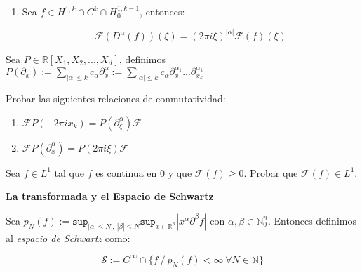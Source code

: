 \documentclass[11pt]{article}
\newcommand{\R}{{\mathbb{R}}}
\newcommand{\N}{{\mathbb{N}}}
\newenvironment{definition}[1][Definici\'on]{\begin{trivlist}
\item[\hskip \labelsep {\bfseries #1}]}{\end{trivlist}}
\newcommand{\F}{\mathcal{F}}
\newcommand{\Sw}{\mathcal{S}}
\begin{document}
\begin{enumerate}
\begin{enumerate}
\item Sea $f \in H^{1,k}\cap C^k \cap H_0^{1,k-1}$, entonces:

$$\F(D^{\alpha}(f))(\xi) = (2 \pi i \xi)^{|\alpha|} \F(f)(\xi)$$ 

\end{enumerate}

\begin{definition}

Sea $P \in \R[X_1,X_2,...,X_d]$, definimos $P(\partial_x):= \sum_{|\alpha| \leq k} {c_{\alpha} \partial_x^{\alpha}} := \sum_{|\alpha| \leq k}{c_{\alpha}\partial_{x_1}^{\alpha_1}...\partial_{x_k}^{\alpha_k}}$

\end{definition}

\item Probar las siguientes relaciones de conmutatividad:

\begin{enumerate}

\item $\F P(-2 \pi i x_k) = P(\partial_{\xi}^{\alpha})\F$
\item $\F P(\partial_{x}^{\alpha}) = P(2\pi i \xi)\F$

\end{enumerate}

\item Sea $f \in L^1$ tal que $f$ es continua en $0$ y que $\F(f)\geq 0$. Probar que $\F(f) \in L^1$.


\bigskip

\textbf{La transformada y el Espacio de Schwartz}

\begin{definition}

Sea $p_N(f):= {\texttt{sup}_{|\alpha| \leq N \ , \ |\beta|\leq N}\texttt{sup}_{x \in \R^n}}{\left| x^{\alpha}\partial^{\beta}f \right|}$ con $\alpha,\beta \in \N_0^{n}$. Entonces definimos al \textit{espacio de Schwartz} como:

$$\Sw := C^{\infty} \cap \{f \ / \ p_N(f) < \infty \ \forall N \in \N \} $$

\end{definition}

\item 

\begin{enumerate}


\end{enumerate}
\end{enumerate}
\end{document}
